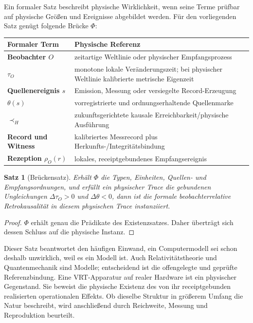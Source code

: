 \documentclass[11pt,a4paper]{article}
\newtheorem{satz}{Satz}[section]
\theoremstyle{remark}
\newcommand{\host}{\prec_{\!H}}
\begin{document}
Ein formaler Satz beschreibt physische Wirklichkeit, wenn seine Terme
prüfbar auf physische Größen und Ereignisse abgebildet werden. Für den
vorliegenden Satz genügt folgende Brücke \(\Phi\):

\begin{center}
\begin{tabularx}{\textwidth}{>{\bfseries}p{}X}
\toprule
Formaler Term & Physische Referenz \\
\midrule
Beobachter \(O\) & zeitartige Weltlinie oder physischer Empfangsprozess \\
\(\tau_O\) & monotone lokale Veränderungszeit; bei physischer Weltlinie
kalibrierte metrische Eigenzeit \\
Quellenereignis \(s\) & Emission, Messung oder versiegelte Record-Erzeugung \\
\(\theta(s)\) & vorregistrierte und ordnungserhaltende Quellenmarke \\
\(\host\) & zukunftsgerichtete kausale Erreichbarkeit/physische Ausführung \\
Record und Witness & kalibriertes Messrecord plus Herkunfts-/Integritätsbindung \\
Rezeption \(\rho_O(r)\) & lokales, receiptgebundenes Empfangsereignis \\
\bottomrule
\end{tabularx}
\end{center}

\begin{satz}[Brückensatz]
Erhält \(\Phi\) die Typen, Einheiten, Quellen- und Empfangsordnungen, und
erfüllt ein physischer Trace die gebundenen Ungleichungen
\(\Delta\tau_O>0\) und \(\Delta\theta<0\), dann ist die formale
beobachterrelative Retrokausalität in diesem physischen Trace instanziiert.
\end{satz}

\begin{proof}
\(\Phi\) erhält genau die Prädikate des Existenzsatzes. Daher überträgt sich
dessen Schluss auf die physische Instanz.
\end{proof}

Dieser Satz beantwortet den häufigen Einwand, ein Computermodell sei schon
deshalb unwirklich, weil es ein Modell ist. Auch Relativitätstheorie und
Quantenmechanik sind Modelle; entscheidend ist die offengelegte und geprüfte
Referenzbindung. Eine VRT-Apparatur auf realer Hardware ist ein physischer
Gegenstand. Sie beweist die physische Existenz des von ihr receiptgebunden
realisierten operationalen Effekts. Ob dieselbe Struktur in größerem Umfang
die Natur beschreibt, wird anschließend durch Reichweite, Messung und
Reproduktion beurteilt.
\end{document}
